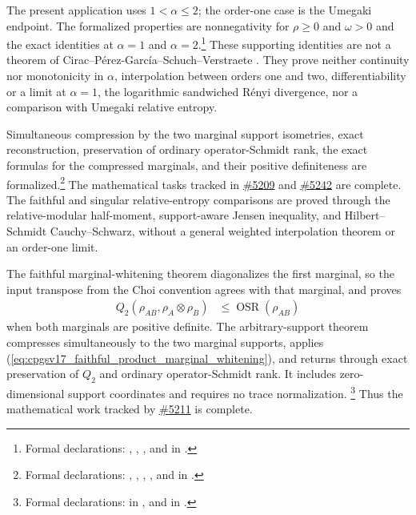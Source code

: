 \documentclass[11pt]{article}
\begin{document}
The present application uses $1<\alpha\leq2$; the order-one case is the
Umegaki endpoint. The formalized properties are nonnegativity for
$\rho\geq0$ and $\omega>0$ and the exact identities at $\alpha=1$ and
$\alpha=2$.\footnote{Formal declarations:
,
,
, and
 in
.}
These supporting identities are not a theorem of
Cirac--P\'erez-Garc\'ia--Schuch--Verstraete
\cite{Cirac2016MPDO_arXiv}. They prove neither continuity nor monotonicity in
$\alpha$, interpolation between orders one and two, differentiability or a
limit at $\alpha=1$, the logarithmic sandwiched R\'enyi divergence, nor a
comparison with Umegaki relative entropy.

Simultaneous compression by the two marginal support isometries, exact
reconstruction, preservation of ordinary operator-Schmidt rank, the exact
formulas for the compressed marginals, and their positive definiteness are
formalized.\footnote{Formal declarations:
,
,
,
, and
 in
.}
The mathematical tasks tracked in
\href{https://github.com/LionSR/TNLean/issues/5209}{\#5209} and
\href{https://github.com/LionSR/TNLean/issues/5242}{\#5242} are complete. The
faithful and singular relative-entropy comparisons are proved through the
relative-modular half-moment, support-aware Jensen inequality, and
Hilbert--Schmidt Cauchy--Schwarz, without a general weighted interpolation
theorem or an order-one limit.

The faithful marginal-whitening theorem diagonalizes the first marginal, so
the input transpose from the Choi convention agrees with that marginal, and
proves
\begin{align}
    Q_2(\rho_{AB},\rho_A\otimes\rho_B)
        &\leq \operatorname{OSR}(\rho_{AB})
    \label{eq:cpgsv17_faithful_product_marginal_whitening}
\end{align}
when both marginals are positive definite. The arbitrary-support theorem
compresses simultaneously to the two marginal supports, applies
(\ref{eq:cpgsv17_faithful_product_marginal_whitening}), and returns through
exact preservation of $Q_2$ and ordinary operator-Schmidt rank. It includes
zero-dimensional support coordinates and requires no trace normalization.
\footnote{Formal declarations:
in , and
in .}
Thus the mathematical work tracked by
\href{https://github.com/LionSR/TNLean/issues/5211}{\#5211} is complete.
\end{document}

